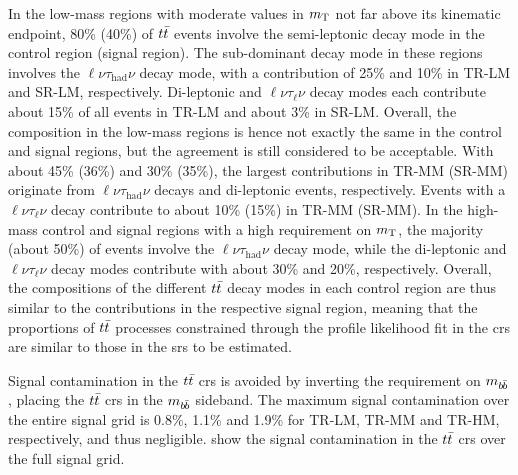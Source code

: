  In the low-mass regions with moderate values in $m_{\textrm{T}}$ not far above its kinematic endpoint, 80\% (40\%) of $t\bar{t}$ events involve the semi-leptonic decay mode in the control region (signal region).
 The sub-dominant decay mode in these regions involves the $\ell\nu\tau_\mathrm{had}\nu$ decay mode, with a contribution of 25\% and 10\% in TR-LM and SR-LM, respectively.
 Di-leptonic and $\ell\nu\tau_\mathrm{\ell}\nu$ decay modes each contribute about 15\% of all events in TR-LM and about 3\% in SR-LM.
 Overall, the composition in the low-mass regions is hence not exactly the same in the control and signal regions, but the agreement is still considered to be acceptable.
 With about 45\% (36\%) and 30\% (35\%), the largest contributions in TR-MM (SR-MM) originate from $\ell\nu\tau_\mathrm{had}\nu$ decays and di-leptonic events, respectively.
 Events with a $\ell\nu\tau_\mathrm{\ell}\nu$ decay contribute to about 10\% (15\%) in TR-MM (SR-MM). 
 In the high-mass control and signal regions with a high requirement on $m_{\textrm{T}}$, the majority (about 50\%) of events involve the $\ell\nu\tau_\mathrm{had}\nu$ decay mode, while the di-leptonic and $\ell\nu\tau_\mathrm{\ell}\nu$ decay modes contribute with about 30\% and 20\%, respectively.
 Overall, the compositions of the different $t\bar{t}$ decay modes in each control region are thus similar to the contributions in the respective signal region, meaning that the proportions of $t\bar{t}$ processes constrained through the profile likelihood fit in the \glspl{cr} are similar to those in the \glspl{sr} to be estimated.

Signal contamination in the $t\bar{t}$ \glspl{cr} is avoided by inverting the requirement on $m_{b\hspace{-0.06em}\bar{b}}$, \ie placing the $t\bar{t}$ \glspl{cr} in the $m_{b\hspace{-0.06em}\bar{b}}$ sideband.
The maximum signal contamination over the entire signal grid is 0.8\%, 1.1\% and 1.9\% for TR-LM, TR-MM and TR-HM, respectively, and thus negligible.  show the signal contamination in the $t\bar{t}$ \glspl{cr} over the full signal grid. 

